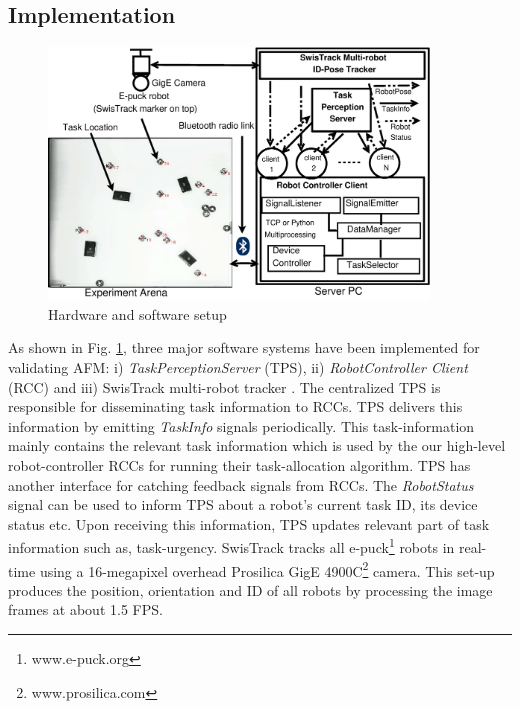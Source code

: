 \documentclass[smallcondensed]{svjour3}
\begin{document}
\subsection{Implementation}
\label{sec:impl}
\begin{figure}
\centering
\includegraphics[width=0.9\textwidth, angle=0]
{./images/RIL-Expt-Setup1.eps}
\caption{\small Hardware and software setup}
\label{fig:setup} %
\end{figure}
As shown in Fig. \ref{fig:setup}, three major software systems have been implemented for validating AFM: i) \textit{TaskPerceptionServer} (TPS), ii) \textit{RobotController Client} (RCC) and iii) SwisTrack multi-robot tracker \citep{Lochmatter+2008}. The centralized TPS is responsible for disseminating task information to RCCs. TPS delivers this information by emitting \textit{TaskInfo} signals periodically. This task-information mainly contains the relevant task information which is used by the our high-level robot-controller RCCs for running their task-allocation algorithm. TPS has another interface for catching feedback signals from RCCs. The \textit{RobotStatus} signal can be used to inform TPS about a robot's current task ID, its device status etc. Upon  receiving this information, TPS updates relevant part of task information such as, task-urgency.  SwisTrack  tracks all e-puck\footnote{www.e-puck.org} robots in real-time using a 16-megapixel overhead Prosilica GigE 4900C\footnote{www.prosilica.com}  camera. This set-up produces the position, orientation and ID of all  robots by processing the image frames at about 1.5 FPS.  
\end{document}
